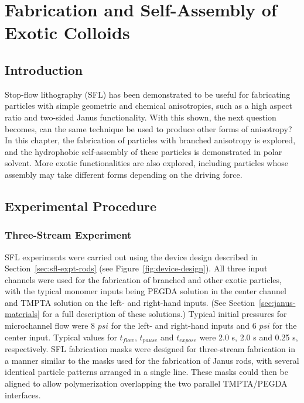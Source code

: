 \chapter{Fabrication and Self-Assembly of Exotic Colloids}
\label{ch:exotic}

\section{Introduction}

Stop-flow lithography (SFL) has been demonstrated to be useful for fabricating particles with 
simple geometric and chemical anisotropies, such as a high aspect ratio and 
two-sided Janus functionality.
With this shown, the next question becomes, can the same technique be used to produce other forms of 
anisotropy?  In this chapter, the fabrication of particles with branched anisotropy is explored, and 
the hydrophobic self-assembly of these particles is demonstrated in polar solvent.  More exotic 
functionalities are also explored, including particles whose assembly may take different forms 
depending on the driving force.


\section{Experimental Procedure}
\label{sec:SFLx3}

\subsection{Three-Stream Experiment}


SFL experiments were carried out using the device design described in Section~\ref{sec:sfl-expt-rods} 
(see Figure~\ref{fig:device-design}).  All three input channels were used for the fabrication of 
branched and other exotic particles, with the typical monomer inputs being PEGDA solution in
the center channel and TMPTA solution on the left- and right-hand inputs. (See 
Section~\ref{sec:janus-materials} for a full description of these solutions.) 
Typical initial pressures for microchannel
flow were 8 $psi$ for the left- and right-hand inputs and 6 $psi$ for
the center input. Typical values for $t_{flow}$, $t_{pause}$ and $t_{expose}$ were 2.0 s, 2.0 s and 0.25 s, 
respectively.  SFL fabrication masks were designed for three-stream fabrication in a manner similar to 
the masks used for the fabrication of Janus rods, with several identical particle patterns arranged
in a single line.  These masks could then be aligned to allow polymerization overlapping the 
two parallel TMPTA/PEGDA interfaces.

